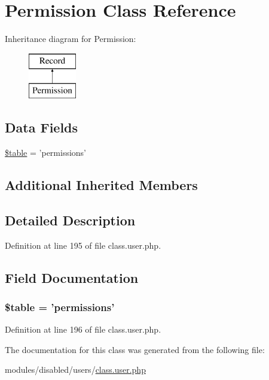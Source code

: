 \hypertarget{class_permission}{\section{Permission Class Reference}
\label{class_permission}
}
Inheritance diagram for Permission\-:\begin{figure}[H]
\begin{center}
\leavevmode
\includegraphics[height=2.000000cm]{class_permission}
\end{center}
\end{figure}
\subsection*{Data Fields}
\begin{DoxyCompactItemize}
\item 
\hyperlink{class_permission_ae8876a14058f368335baccf35af4a22b}{\$table} = 'permissions'
\end{DoxyCompactItemize}
\subsection*{Additional Inherited Members}


\subsection{Detailed Description}


Definition at line 195 of file class.\-user.\-php.



\subsection{Field Documentation}
\hypertarget{class_permission_ae8876a14058f368335baccf35af4a22b}{
\subsubsection[{\$table}]{\setlength{\rightskip}{0pt plus 5cm}\$table = 'permissions'}}\label{class_permission_ae8876a14058f368335baccf35af4a22b}


Definition at line 196 of file class.\-user.\-php.



The documentation for this class was generated from the following file\-:\begin{DoxyCompactItemize}
\item 
modules/disabled/users/\hyperlink{class_8user_8php}{class.\-user.\-php}\end{DoxyCompactItemize}
